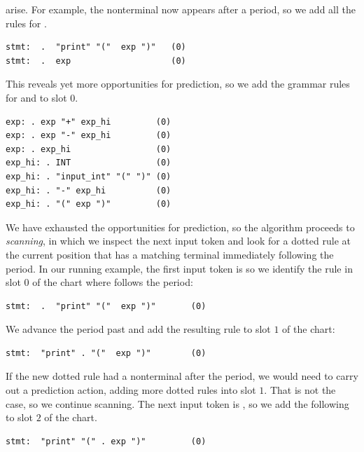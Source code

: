 \documentclass[7x10]{TimesAPriori_MIT}%
\numberwithin{theorem}{chapter}
\numberwithin{definition}{chapter}
\numberwithin{equation}{chapter}
\begin{document}
{arise. For example, the  nonterminal now appears after a
period, so we add all the rules for .
\begin{lstlisting}
stmt:  .  "print" "("  exp ")"   (0)
stmt:  .  exp                    (0)
\end{lstlisting}
This reveals yet more opportunities for prediction, so we add the grammar
rules for  and  to slot $0$.
\begin{lstlisting}[escapechar=$]
exp: . exp "+" exp_hi         (0)
exp: . exp "-" exp_hi         (0)
exp: . exp_hi                 (0)
exp_hi: . INT                 (0)
exp_hi: . "input_int" "(" ")" (0)
exp_hi: . "-" exp_hi          (0)
exp_hi: . "(" exp ")"         (0)
\end{lstlisting}

We have exhausted the opportunities for prediction, so the algorithm
proceeds to \emph{scanning}, in which we inspect the next input token
and look for a dotted rule at the current position that has a matching
terminal immediately following the period. In our running example, the
first input token is  so we identify the rule in slot
$0$ of the chart where  follows the period:
\begin{lstlisting}
stmt:  .  "print" "("  exp ")"       (0)
\end{lstlisting}
We advance the period past  and add the resulting rule
to slot $1$ of the chart:
\begin{lstlisting}
stmt:  "print" . "("  exp ")"        (0)
\end{lstlisting}
If the new dotted rule had a nonterminal after the period, we would
need to carry out a prediction action, adding more dotted rules into
slot $1$. That is not the case, so we continue scanning. The next
input token is , so we add the following to slot $2$ of the
chart.
\begin{lstlisting}
stmt:  "print" "(" . exp ")"         (0)
\end{lstlisting}

}
\end{document}
